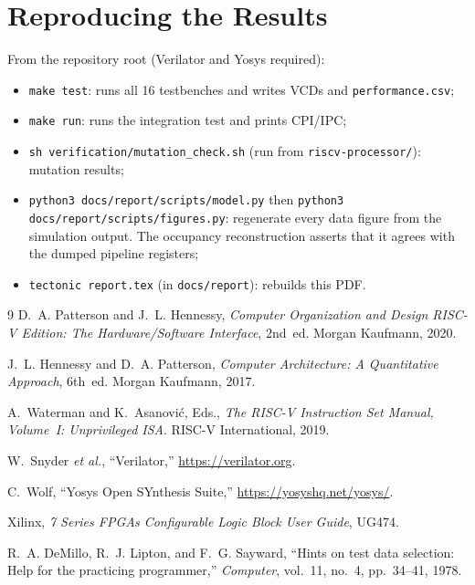 \documentclass[conference]{IEEEtran}
\newcommand{\code}[1]{\texttt{\small #1}}
\begin{document}
\appendices
\section{Reproducing the Results}
From the repository root (Verilator and Yosys required):
\begin{itemize}
  \item \code{make test}: runs all 16 testbenches and writes VCDs and \code{performance.csv};
  \item \code{make run}: runs the integration test and prints CPI/IPC;
  \item \code{sh verification/mutation\_check.sh} (run from \code{riscv-processor/}): mutation results;
  \item \code{python3 docs/report/scripts/model.py} then \code{python3 docs/report/scripts/figures.py}: regenerate every data figure from the simulation output. The occupancy reconstruction asserts that it agrees with the dumped pipeline registers;
  \item \code{tectonic report.tex} (in \code{docs/report}): rebuilds this PDF.
\end{itemize}

\balance
\begin{thebibliography}{9}
D.~A. Patterson and J.~L. Hennessy, \emph{Computer Organization and Design RISC-V Edition: The Hardware/Software Interface}, 2nd~ed. Morgan Kaufmann, 2020.

J.~L. Hennessy and D.~A. Patterson, \emph{Computer Architecture: A Quantitative Approach}, 6th~ed. Morgan Kaufmann, 2017.

A.~Waterman and K.~Asanovi\'c, Eds., \emph{The RISC-V Instruction Set Manual, Volume~I: Unprivileged ISA}. RISC-V International, 2019.

W.~Snyder \emph{et al.}, ``Verilator,'' \url{https://verilator.org}.

C.~Wolf, ``Yosys Open SYnthesis Suite,'' \url{https://yosyshq.net/yosys/}.

Xilinx, \emph{7 Series FPGAs Configurable Logic Block User Guide}, UG474.

R.~A. DeMillo, R.~J. Lipton, and F.~G. Sayward, ``Hints on test data selection: Help for the practicing programmer,'' \emph{Computer}, vol.~11, no.~4, pp.~34--41, 1978.
\end{thebibliography}
\end{document}
